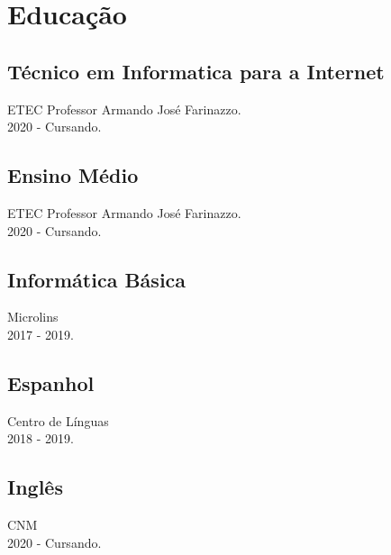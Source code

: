\documentclass[16pt]{article}
\begin{document}
  \section{Educação}
    \begin{minipage}[t]{0.47\linewidth}
      \subsection{Técnico em Informatica para a Internet}
        ETEC Professor Armando José Farinazzo.\\
        2020 - Cursando.\\
      \subsection{Ensino Médio}
        ETEC Professor Armando José Farinazzo.\\
        2020 - Cursando.\\
    \end{minipage}
    \hfill\vline\hfill
    \begin{minipage}[t]{0.5\linewidth}
      \subsection{Informática Básica}
        Microlins\\
        2017 - 2019.\\
      \subsection{Espanhol}
        Centro de Línguas\\
        2018 - 2019.
      \subsection{Inglês}
        CNM\\
        2020 - Cursando.
    \end{minipage}
\end{document}
